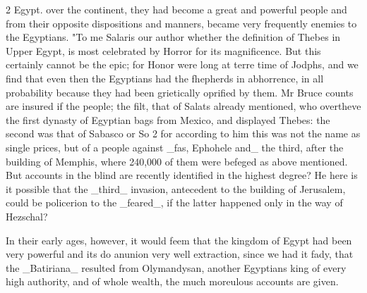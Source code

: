 \documentclass[10pt]{article}
\begin{document}
\begin{multicols}{2}\raggedcolumns
Egypt. over the continent, they had become a great and powerful people and from their opposite dispositions and manners, became very frequently enemies to the Egyptians. "To me Salaris our author whether the definition of Thebes in Upper Egypt, is most celebrated by Horror for its magnificence. But this certainly cannot be the epic; for Honor were long at terre time of Jodphs, and we find that even then the Egyptians had the fhepherds in abhorrence, in all probability because they had been grietically oprified by them. Mr Bruce counts are insured if the people; the filt, that of Salats already mentioned, who overtheve the first dynasty of Egyptian bags from Mexico, and displayed Thebes: the second was that of Sabasco or So 2 for according to him this was not the name as single prices, but of a people against \_fas, Ephohele and\_ the third, after the building of Memphis, where 240,000 of them were befeged as above mentioned. But accounts in the blind are recently identified in the highest degree? He here is it possible that the \_third\_ invasion, antecedent to the building of Jerusalem, could be policerion to the \_feared\_, if the latter happened only in the way of Hezschal?

In their early ages, however, it would feem that the kingdom of Egypt had been very powerful and its do anunion very well extraction, since we had it fady, that the \_Batiriana\_ resulted from Olymandysan, another Egyptians king of every high authority, and of whole wealth, the much moreulous accounts are given.


\end{multicols}
\end{document}
